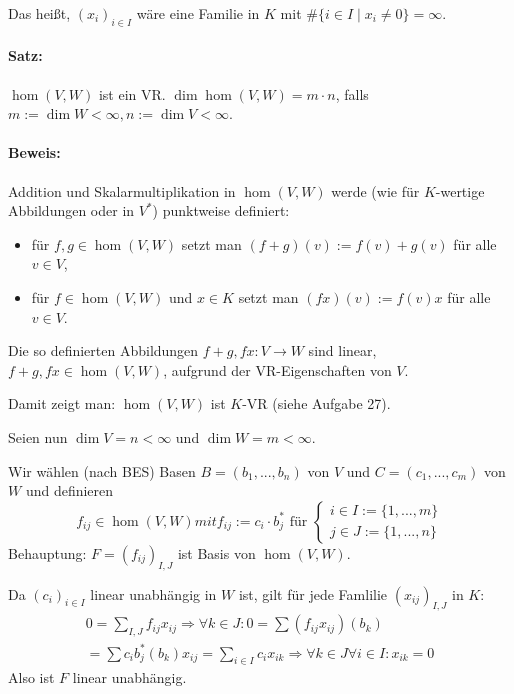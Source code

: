 	Das heißt, $(x_i)_{i\in I}$ wäre eine Familie in $ K $ mit $\#\{i\in I\mid x_i\neq 0\}=\infty$.

\paragraph{Satz:}
	$ \hom (V,W) $ ist ein VR. $\dim\hom (V,W) = m\cdot n$, falls $m:=\dim W<\infty, n:=\dim V< \infty$.
	
\paragraph{Beweis:}
	Addition und Skalarmultiplikation in $\hom (V,W)$ werde (wie für $K$-wertige Abbildungen oder in $V^*$) punktweise definiert:
	\begin{itemize}
		\item für $f,g \in \hom (V,W)$ setzt man $(f+g)(v) := f(v) + g(v)$ für alle $v\in V$,
		\item für $f\in \hom (V,W)$ und $x\in K$ setzt man $(fx)(v) := f(v)x$ für alle $v\in V$.
	\end{itemize}
	Die so definierten Abbildungen $f+g,fx: V\to W$ sind linear, $f+g, fx\in \hom (V,W)$, aufgrund der VR-Eigenschaften von $V$.
	
	Damit zeigt man: $\hom (V,W)$ ist $K$-VR (siehe Aufgabe 27).
	
	Seien nun $\dim V = n < \infty$ und $\dim W = m < \infty$.
	
	Wir wählen (nach BES) Basen $B = (b_1,...,b_n)$ von $V$ und $C=(c_1,...,c_m)$ von $W$ und definieren
		\begin{equation*}
			f_{ij}\in \hom (V,W) mit f_{ij}:= c_i\cdot b_j^* \text{ für } 
				\begin{cases}
					i\in I := \{1,...,m\}\\
					j\in J := \{1,...,n\}
				\end{cases}
		\end{equation*}
	Behauptung: $F=(f_{ij})_{I,J}$ ist Basis von $\hom (V,W)$.
	
	Da $(c_i)_{i\in I}$ linear unabhängig in $W$ ist, gilt für jede Famlilie $(x_{ij})_{I,J}$ in $K$:
		\begin{gather*}
			0 = \sum_{I,J} f_{ij}x_{ij} \Rightarrow \forall k \in J: 0 = \sum (f_{ij}x_{ij})(b_k)\\
			= \sum c_i b_j^* (b_k) x_{ij} = \sum_{i\in I} c_ix_{ik} \Rightarrow \forall k\in J\forall i\in I:x_{ik} = 0
		\end{gather*}
	Also ist $F$ linear unabhängig.
	

